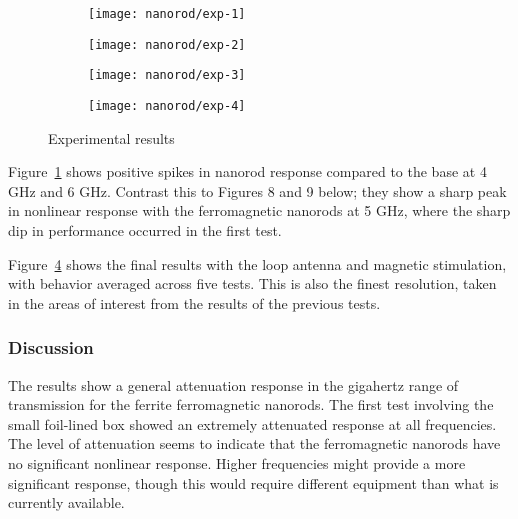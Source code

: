 \begin{figure}[h!]
    \centering
    \begin{subfigure}{0.45\textwidth}
        \centering
        \texttt{[image: nanorod/exp-1]}
        \caption[]{}
        \label{fig:nanorod-exp-1}
    \end{subfigure}
        \begin{subfigure}{0.45\textwidth}
        \centering
        \texttt{[image: nanorod/exp-2]}
        \caption[]{}
        \label{fig:nanorod-exp-2}
    \end{subfigure}
        \begin{subfigure}{0.45\textwidth}
        \centering
        \texttt{[image: nanorod/exp-3]}
        \caption[]{}
        \label{fig:nanorod-exp-3}
    \end{subfigure}
        \begin{subfigure}{0.45\textwidth}
        \centering
        \texttt{[image: nanorod/exp-4]}
        \caption[]{}
        \label{fig:nanorod-exp-4}
    \end{subfigure}
    \caption[Ferromagnetic nanorod experimental results]{Experimental results}
    \label{fig:nanorod-results}
\end{figure}

Figure~\ref{fig:nanorod-exp-1} shows positive spikes in nanorod response compared to the base at 4 GHz and 6 GHz. Contrast this to Figures 8 and 9 below; they show a sharp peak in nonlinear response with the ferromagnetic nanorods at 5 GHz, where the sharp dip in performance occurred in the first test.

Figure~\ref{fig:nanorod-exp-4} shows the final results with the loop antenna and magnetic stimulation, with behavior averaged across five tests. This is also the finest resolution, taken in the areas of interest from the results of the previous tests.

\subsubsection{Discussion}

The results show a general attenuation response in the gigahertz range of transmission for the ferrite ferromagnetic nanorods. The first test involving the small foil-lined box showed an extremely attenuated response at all frequencies. The level of attenuation seems to indicate that the ferromagnetic nanorods have no significant nonlinear response. Higher frequencies might provide a more significant response, though this would require different equipment than what is currently available.

